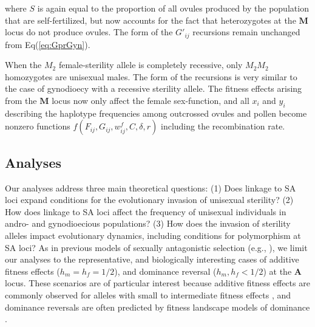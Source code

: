 \documentclass[9pt,twocolumn,twoside,lineno]{gsajnl}
\begin{document}
\noindent where $S$ is again equal to the proportion of all ovules produced by the population that are self-fertilized, but now accounts for the fact that heterozygotes at the $\mathbf{M}$ locus do not produce ovules. The form of the $G'_{ij}$ recursions remain unchanged from Eq(\ref{eq:GprGyn}).

When the $M_2$ female-sterility allele is completely recessive, only $M_2M_2$ homozygotes are unisexual males. The form of the recursions is very similar to the case of gynodioecy with a recessive sterility allele. The fitness effects arising from the $\mathbf{M}$ locus now only affect the female sex-function, and all $x_i$ and $y_i$ describing the haplotype frequencies among outcrossed ovules and pollen become nonzero functions $f(F_{ij},G_{ij},w^f_{ij},C,\delta,r)$ including the recombination rate.


\subsection{Analyses} \label{subsec:analyses}

Our analyses address three main theoretical questions: (1) Does linkage to SA loci expand conditions for the evolutionary invasion of unisexual sterility? (2) How does linkage to SA loci affect the frequency of unisexual individuals in andro- and gynodioecious populations? (3) How does the invasion of sterility alleles impact evolutionary dynamics, including conditions for polymorphism at SA loci? As in previous models of sexually antagonistic selection (e.g., \citealp{Kidwell1977,Prout2000,JordanConnallon2014}), we limit our analyses to the representative, and biologically interesting cases of additive fitness effects ($h_m = h_f = 1/2$), and dominance reversal ($h_m, h_f < 1/2$) at the $\mathbf{A}$ locus. These scenarios are of particular interest because additive fitness effects are commonly observed for alleles with small to intermediate fitness effects \citep{Agrawal2011}, and dominance reversals are often predicted by fitness landscape models of dominance \citep{Manna2011, ConnallonClark2014}.
\end{document}
